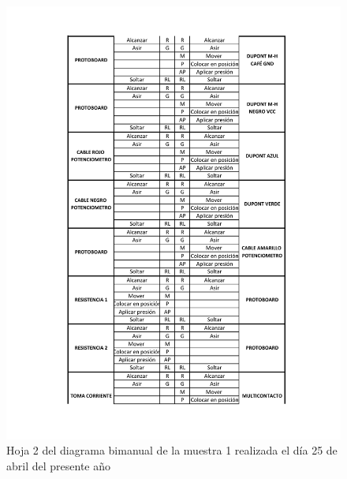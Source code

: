     \begin{figure}[H]
        \centering
        \includegraphics[trim = {1mm 1mm 1mm 1mm},clip,scale=0.45]{34/img/diagramaBimanual2.pdf}
        \caption{Hoja 2 del diagrama bimanual de la muestra 1 realizada el día 25 de abril del presente año}
        \label{fig:diagramaBimanual2}
    \end{figure}
    
